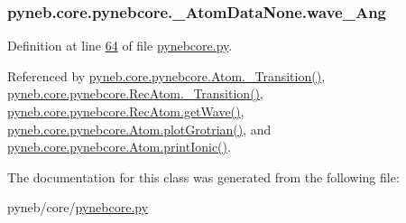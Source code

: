 \hypertarget{classpyneb_1_1core_1_1pynebcore_1_1___atom_data_none_a6a6e8b052741d46963b85c0cdcb9fd79}{
\subsubsection[{wave\-\_\-\-Ang}]{\setlength{\rightskip}{0pt plus 5cm}pyneb.\-core.\-pynebcore.\-\_\-\-Atom\-Data\-None.\-wave\-\_\-\-Ang}}\label{classpyneb_1_1core_1_1pynebcore_1_1___atom_data_none_a6a6e8b052741d46963b85c0cdcb9fd79}


Definition at line \hyperlink{pynebcore_8py_source_l00064}{64} of file \hyperlink{pynebcore_8py_source}{pynebcore.\-py}.



Referenced by \hyperlink{pynebcore_8py_source_l01433}{pyneb.\-core.\-pynebcore.\-Atom.\-\_\-\-Transition()}, \hyperlink{pynebcore_8py_source_l02812}{pyneb.\-core.\-pynebcore.\-Rec\-Atom.\-\_\-\-Transition()}, \hyperlink{pynebcore_8py_source_l02699}{pyneb.\-core.\-pynebcore.\-Rec\-Atom.\-get\-Wave()}, \hyperlink{pynebcore_8py_source_l02443}{pyneb.\-core.\-pynebcore.\-Atom.\-plot\-Grotrian()}, and \hyperlink{pynebcore_8py_source_l02233}{pyneb.\-core.\-pynebcore.\-Atom.\-print\-Ionic()}.



The documentation for this class was generated from the following file\-:\begin{DoxyCompactItemize}
\item 
pyneb/core/\hyperlink{pynebcore_8py}{pynebcore.\-py}\end{DoxyCompactItemize}
